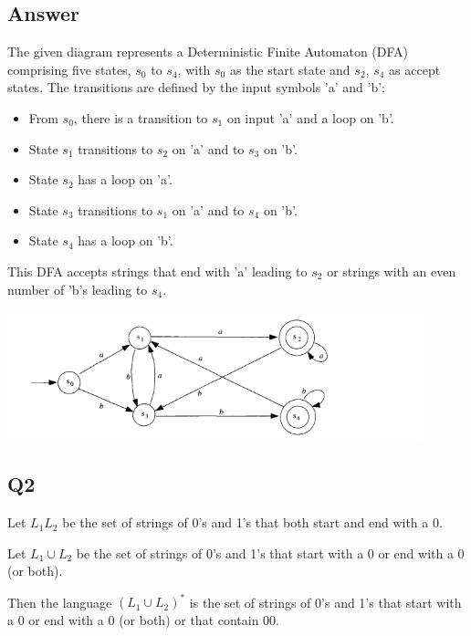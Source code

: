\documentclass{article}
\begin{document}
\subsection*{Answer}

The given diagram represents a Deterministic Finite Automaton (DFA) comprising five states, \( s_0 \) to \( s_4 \), with \( s_0 \) as the start state and \( s_2 \), \( s_4 \) as accept states. The transitions are defined by the input symbols 'a' and 'b':

\begin{itemize}
    \item From \( s_0 \), there is a transition to \( s_1 \) on input 'a' and a loop on 'b'.
    \item State \( s_1 \) transitions to \( s_2 \) on 'a' and to \( s_3 \) on 'b'.
    \item State \( s_2 \) has a loop on 'a'.
    \item State \( s_3 \) transitions to \( s_1 \) on 'a' and to \( s_4 \) on 'b'.
    \item State \( s_4 \) has a loop on 'b'.
\end{itemize}

This DFA accepts strings that end with 'a' leading to \( s_2 \) or strings with an even number of 'b's leading to \( s_4 \).
\begin{center}
    \includegraphics[width=12cm]{1.png}
\end{center}
\newpage
\subsection*{Q2}

Let \( L_1L_2 \) be the set of strings of 0's and 1's that both start and end with a 0.

Let \( L_1 \cup L_2 \) be the set of strings of 0's and 1's that start with a 0 or end with a 0 (or both).

Then the language \( (L_1 \cup L_2)^* \) is the set of strings of 0's and 1's that start with a 0 or end with a 0 (or both) or that contain 00.

\newpage
\end{document}
